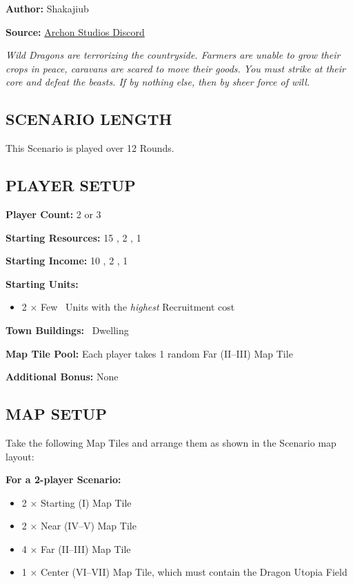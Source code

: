 
\begin{multicols*}{2}

\textbf{Author:} Shakajiub

\textbf{Source:} \href{https://discord.com/channels/740870068178649108/1237891632448278618}{Archon Studios Discord}

\textit{Wild Dragons are terrorizing the countryside.
Farmers are unable to grow their crops in peace, caravans are scared to move their goods.
You must strike at their core and defeat the beasts.
If by nothing else, then by sheer force of will.}

\subsection*{\MakeUppercase{Scenario Length}}
This Scenario is played over 12 Rounds.

\subsection*{\MakeUppercase{Player Setup}}
\textbf{Player Count:} 2 or 3

\textbf{Starting Resources:} 15 , 2 , 1 

\textbf{Starting Income:} 10 , 2 , 1 

\textbf{Starting Units:}
\begin{itemize}
  \item 2 × Few \bronze\ Units with the \textit{highest} Recruitment cost
\end{itemize}

\textbf{Town Buildings:} \bronze\ Dwelling

\textbf{Map Tile Pool:} Each player takes 1 random Far (II--III) Map Tile

\textbf{Additional Bonus:} None

\subsection*{\MakeUppercase{Map Setup}}
Take the following Map Tiles and arrange them as shown in the Scenario map layout:

\textbf{For a 2-player Scenario:}
\begin{itemize}
  \item 2 × Starting (I) Map Tile
  \item 2 × Near (IV--V) Map Tile
  \item 4 × Far (II--III) Map Tile
  \item 1 × Center (VI--VII) Map Tile, which must contain the Dragon Utopia Field
\end{itemize}


\end{multicols*}
